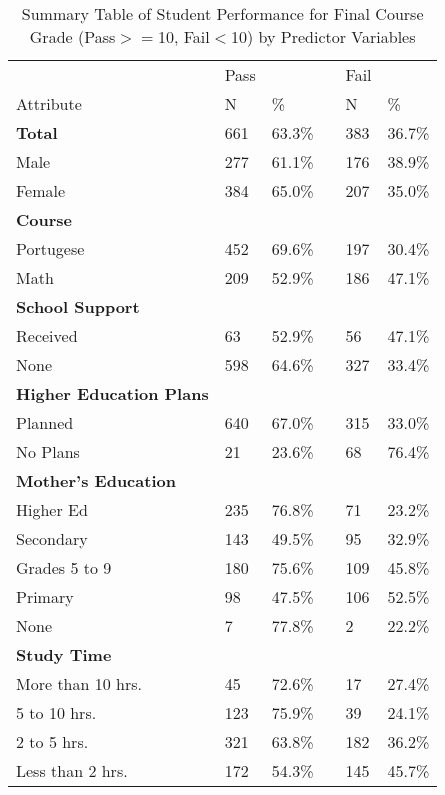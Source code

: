 \documentclass[sigconf]{acmart}
\begin{document}
\begin{table}
  \caption{Summary Table of Student Performance for Final Course Grade 
  (Pass$>=$10, Fail$<$10) by Predictor Variables }
  \label{tab:freq}
  \begin{tabular}{llllll}
    \toprule
              & Pass & & & Fail & \\
    Attribute & N & \% &  & N & \% \\
    \midrule
    \textbf{Total} & 661 & 63.3\% & & 383 & 36.7\% \\
    \midrule
    Male      & 277 & 61.1\% & & 176 & 38.9\%  \\
    Female    & 384 & 65.0\% & & 207 & 35.0\%  \\
    \midrule
    \textbf{Course} &  &  &  &  & \\
    Portugese       & 452 & 69.6\% & & 197 & 30.4\%  \\
    Math            & 209 & 52.9\% & & 186 & 47.1\%  \\  
    \midrule
    \textbf{School Support} &  &  &  &  & \\
    Received        &  63 & 52.9\% & &  56 & 47.1\%  \\
    None            & 598 & 64.6\% & & 327 & 33.4\%  \\ 
    \midrule    
    \textbf{Higher Education Plans} &  &  &  &  & \\
    Planned         & 640 & 67.0\% & & 315 & 33.0\%  \\
    No Plans        &  21 & 23.6\% & &  68 & 76.4\%  \\
    \midrule
    \textbf{Mother's Education} &  &  &  &  & \\
    Higher Ed       & 235 & 76.8\% & &  71 & 23.2\% \\
    Secondary       & 143 & 49.5\% & &  95 & 32.9\% \\
    Grades 5 to 9   & 180 & 75.6\% & & 109 & 45.8\% \\
    Primary         &  98 & 47.5\% & & 106 & 52.5\% \\
    None            &   7 & 77.8\% & &   2 & 22.2\% \\
    \midrule    
    \textbf{Study Time} &   &  &  &  &     \\
    More than 10 hrs. &  45 & 72.6\% & &  17 & 27.4\% \\
    5 to 10 hrs.      & 123 & 75.9\% & &  39 & 24.1\% \\
    2 to 5 hrs.       & 321 & 63.8\% & & 182 & 36.2\% \\    
    Less than 2 hrs.  & 172 & 54.3\% & & 145 & 45.7\% \\

\end{tabular}
\end{table}
\end{document}
